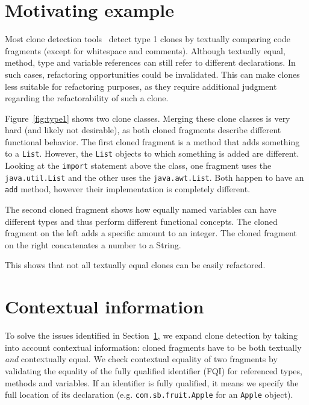 \documentclass[conference]{IEEEtran}
\begin{document}
\section{Motivating example} \label{sec:type1}
Most clone detection tools~\cite{kamiya2002ccfinder, semura2017ccfindersw, roy2008nicad, svajlenko2016bigcloneeval, svajlenko2014evaluating} detect type 1 clones by textually comparing code fragments (except for whitespace and comments). Although textually equal, method, type and variable references can still refer to different declarations. In such cases, refactoring opportunities could be invalidated. This can make clones less suitable for refactoring purposes, as they require additional judgment regarding the refactorability of such a clone.

Figure~\ref{fig:type1} shows two clone classes. Merging these clone classes is very hard (and likely not desirable), as both cloned fragments describe different functional behavior. The first cloned fragment is a method that adds something to a \texttt{List}. However, the \texttt{List} objects to which something is added are different. Looking at the \texttt{import} statement above the class, one fragment uses the \texttt{java.util.List} and the other uses the \texttt{java.awt.List}. Both happen to have an \texttt{add} method, however their implementation is completely different.

The second cloned fragment shows how equally named variables can have different types and thus perform different functional concepts. The cloned fragment on the left adds a specific amount to an integer. The cloned fragment on the right concatenates a number to a String.

This shows that not all textually equal clones can be easily refactored.

\section{Contextual information}
To solve the issues identified in Section~\ref{sec:type1}, we expand clone detection by taking into account contextual information: cloned fragments have to be both textually \textit{and} contextually equal. We check contextual equality of two fragments by validating the equality of the fully qualified identifier (FQI) for referenced types, methods and variables. If an identifier is fully qualified, it means we specify the full location of its declaration (e.g. \texttt{com.sb.fruit.Apple} for an \texttt{Apple} object).
\end{document}
